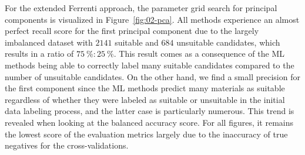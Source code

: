 \documentclass[superscriptaddress,unsortedaddress,
 amsmath,amssymb,
 aps,
]{revtex4-2}
\begin{document}
For the extended Ferrenti approach, the parameter grid search for principal components is visualized in Figure~\ref{fig:02-pca}. All methods experience an almost perfect recall score for the first principal component due to the largely imbalanced dataset with $2141$ suitable and $684$ unsuitable candidates, which results in  a ratio of $75 \ \% : 25 \ \%$. This result comes as a consequence of the ML methods being able to correctly label many suitable candidates compared to the number of unsuitable candidates. 
On the other hand, we find a small precision for the first component since the ML methods  predict many materials as suitable regardless of whether they were labeled as suitable or unsuitable in the initial data labeling process, and the latter case is particularly numerous. 
This trend is revealed when looking at the balanced accuracy score. For all figures, it remains the lowest score of the evaluation metrics largely due to the inaccuracy of true negatives for the cross-validations.  

\begin{table}[t]
\centering
\caption{Optimal number of principal components and the respective scores (standard deviation) for each of the four ML methods logistic regression (LOG), decision trees (DT), random forests (RF) and gradient boosting (GB) in the extended Ferrenti approach, as visualized by the dash-dotted line in Fig.~\ref{fig:02-pca}.}
\label{tab:02-pc}
\noindent{}
\end{table}
\end{document}
